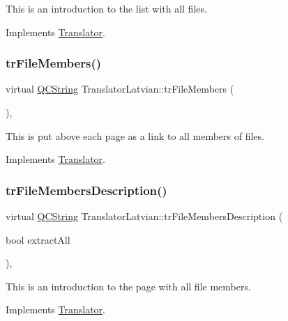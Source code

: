 This is an introduction to the list with all files. 

Implements \mbox{\hyperlink{class_translator}{Translator}}.

\mbox{\label{class_translator_latvian_a1c61d3734d9e83db23d28accfb207e93}} 
\subsubsection{\texorpdfstring{trFileMembers()}{trFileMembers()}}
{\footnotesize\ttfamily virtual \mbox{\hyperlink{class_q_c_string}{Q\+C\+String}} Translator\+Latvian\+::tr\+File\+Members (\begin{DoxyParamCaption}{ }\end{DoxyParamCaption})\hspace{0.3cm}{\ttfamily [inline]}, {\ttfamily [virtual]}}

This is put above each page as a link to all members of files. 

Implements \mbox{\hyperlink{class_translator}{Translator}}.

\mbox{\label{class_translator_latvian_a2a3bfe2d35a83ecc1f45471f3ef2f390}} 
\subsubsection{\texorpdfstring{trFileMembersDescription()}{trFileMembersDescription()}}
{\footnotesize\ttfamily virtual \mbox{\hyperlink{class_q_c_string}{Q\+C\+String}} Translator\+Latvian\+::tr\+File\+Members\+Description (\begin{DoxyParamCaption}\item[{bool}]{extract\+All }\end{DoxyParamCaption})\hspace{0.3cm}{\ttfamily [inline]}, {\ttfamily [virtual]}}

This is an introduction to the page with all file members. 

Implements \mbox{\hyperlink{class_translator}{Translator}}.

\mbox{\label{class_translator_latvian_a39e82e45c6ca0616a27b5c52460b51de}} 
